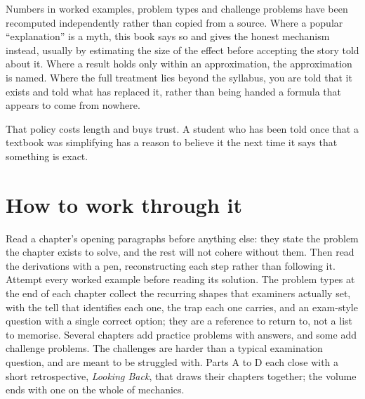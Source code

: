 Numbers in worked examples, problem types and challenge problems have been recomputed independently
rather than copied from a source. Where a popular ``explanation'' is a myth, this book says so and gives the honest
mechanism instead, usually by estimating the size of the effect before accepting the story told about
it. Where a result holds only within an approximation, the approximation is named. Where the full
treatment lies beyond the syllabus, you are told that it exists and told what has replaced it, rather
than being handed a formula that appears to come from nowhere.

That policy costs length and buys trust. A student who has been told once that a textbook was
simplifying has a reason to believe it the next time it says that something is exact.

\section*{How to work through it}

Read a chapter's opening paragraphs before anything else: they state the problem the chapter exists to
solve, and the rest will not cohere without them. Then read the derivations with a pen, reconstructing
each step rather than following it. Attempt every worked example before reading its solution. The
problem types at the end of each chapter collect the recurring shapes that examiners actually set,
with the tell that identifies each one, the trap each one carries, and an exam-style question with a
single correct option; they are a reference to return to, not a list to memorise. Several chapters add
practice problems with answers, and some add challenge problems. The challenges are harder than a
typical examination question, and are meant to be struggled with. Parts A to D each close with a short
retrospective, \emph{Looking Back}, that draws their chapters together; the volume ends with one on the
whole of mechanics.

\cleardoublepage
\tableofcontents
\cleardoublepage
